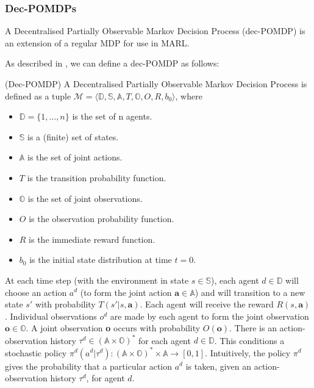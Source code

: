 \subsubsection{Dec-POMDPs}
A Decentralised Partially Observable Markov Decision Process (dec-POMDP) is an extension of a regular MDP for use in MARL. 

As described in \cite{dec-pomdp}, we can define a dec-POMDP as follows:
\begin{definition}\textbf{}{ (Dec-POMDP)}
A Decentralised Partially Observable Markov Decision
Process is defined as a tuple $\mathscr{M} = \langle \mathbb{D,S,A},T,\mathbb{O},O,R,b_0\rangle$, where
\begin{itemize}
    \item $\mathbb{D}=\{1,...,n\}$ is the set of n agents.
    \item $\mathbb{S}$ is a (finite) set of states.
    \item $\mathbb{A}$ is the set of joint actions.
    \item $T$ is the transition probability function.
    \item $\mathbb{O}$ is the set of joint observations.
    \item $O$ is the observation probability function.
    \item $R$ is the immediate reward function.
    \item $b_0$ is the initial state distribution at time $t = 0$.
    
\end{itemize}
\end{definition}

At each time step (with the environment in state $s \in \mathbb{S}$), each agent $d \in \mathbb{D}$ will choose an action $a^d$ (to form the joint action $\textbf{a} \in \mathbb{A}$) and will transition to a new state $s'$ with probability $T(s'|s,\textbf{a})$. Each agent will receive the reward $R(s, \textbf{a})$. Individual observations $o^d$ are made by each agent to form the joint observation $\textbf{o} \in \mathbb{O}$. A joint observation \textbf{o} occurs with probability $O(\textbf{o})$. There is an action-observation history $\tau^d \in (\mathbb{A} \times \mathbb{O})^*$ for each agent $d \in \mathbb{D}$. This conditions a stochastic policy $\pi^d(a^d|\tau^d) : (\mathbb{A} \times \mathbb{O})^* \times \mathbb{A} \to [0, 1]$. Intuitively, the policy $\pi^d$ gives the probability that a particular action $a^d$ is taken, given an action-observation history $\tau^d$, for agent $d$.

